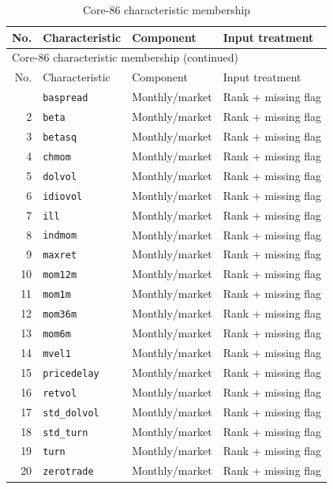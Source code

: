 {\small\setlength{\tabcolsep}{4pt}
\begin{longtable}{@{}rlll@{}}
\caption{Core-86 characteristic membership}\label{tab:dictionary}\\
\toprule
No. & Characteristic & Component & Input treatment\\\midrule\endfirsthead
\multicolumn{4}{l}{Core-86 characteristic membership (continued)}\\\toprule
No. & Characteristic & Component & Input treatment\\\midrule\endhead
\bottomrule\endfoot
1 & \texttt{baspread} & Monthly/market & Rank + missing flag\\
2 & \texttt{beta} & Monthly/market & Rank + missing flag\\
3 & \texttt{betasq} & Monthly/market & Rank + missing flag\\
4 & \texttt{chmom} & Monthly/market & Rank + missing flag\\
5 & \texttt{dolvol} & Monthly/market & Rank + missing flag\\
6 & \texttt{idiovol} & Monthly/market & Rank + missing flag\\
7 & \texttt{ill} & Monthly/market & Rank + missing flag\\
8 & \texttt{indmom} & Monthly/market & Rank + missing flag\\
9 & \texttt{maxret} & Monthly/market & Rank + missing flag\\
10 & \texttt{mom12m} & Monthly/market & Rank + missing flag\\
11 & \texttt{mom1m} & Monthly/market & Rank + missing flag\\
12 & \texttt{mom36m} & Monthly/market & Rank + missing flag\\
13 & \texttt{mom6m} & Monthly/market & Rank + missing flag\\
14 & \texttt{mvel1} & Monthly/market & Rank + missing flag\\
15 & \texttt{pricedelay} & Monthly/market & Rank + missing flag\\
16 & \texttt{retvol} & Monthly/market & Rank + missing flag\\
17 & \texttt{std\_dolvol} & Monthly/market & Rank + missing flag\\
18 & \texttt{std\_turn} & Monthly/market & Rank + missing flag\\
19 & \texttt{turn} & Monthly/market & Rank + missing flag\\
20 & \texttt{zerotrade} & Monthly/market & Rank + missing flag\\

\end{longtable}}
